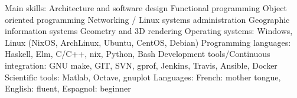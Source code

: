 \begin{cvskills}
  \cvskill
    {Main skills:}
 	{
		Architecture and software design\newline
        Functional programming\newline
        Object oriented programming\newline
        Networking / Linux systems administration\newline
        Geographic information systems\newline
        Geometry and 3D rendering
	}
  \cvskill
    {Operating systems:}
 	{Windows, Linux (NixOS, ArchLinux, Ubuntu, CentOS, Debian)}
  \cvskill
    {Programming languages:}
 	{Haskell, Elm, C/C++, nix, Python, Bash}
  \cvskill
	{Development tools/Continuous integration:}
	{GNU make, GIT, SVN, gprof, Jenkins, Travis, Ansible, Docker}
  \cvskill
	{Scientific tools:}
	{Matlab, Octave, gnuplot}
  \cvskill
    {Languages:}
 	{
        French: mother tongue,
		English: fluent,
		Espagnol: beginner
	}
\end{cvskills}

